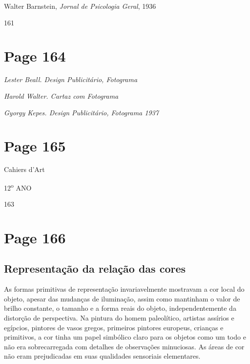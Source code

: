 \documentclass[a4paper]{article}
\begin{document}
\textbullet Walter Barnstein, \textit{Jornal de Psicologia Geral}, 1936

\vspace*{\fill}
\hfill 161

\newpage
\section*{Page 164}

\hspace*{0.3\textwidth}\textit{Lester Beall. Design Publicitário, Fotograma}

\vspace{8em} 

\noindent\textit{Harold Walter. Cartaz com Fotograma}

\vspace{8em} 

\raggedleft\textit{Gyorgy Kepes. Design Publicitário, Fotograma 1937}\par

\vspace{3em} 

\newpage
\section*{Page 165}

Cahiers d'Art

12\textsuperscript{o} ANO

163

\newpage
\section*{Page 166}

\subsection*{Representação da relação das cores}

As formas primitivas de representação invariavelmente mostravam a cor local do objeto, apesar das mudanças de iluminação, assim como mantinham o valor de brilho constante, o tamanho e a forma reais do objeto, independentemente da distorção de perspectiva. Na pintura do homem paleolítico, artistas assírios e egípcios, pintores de vasos gregos, primeiros pintores europeus, crianças e primitivos, a cor tinha um papel simbólico claro para os objetos como um todo e não era sobrecarregada com detalhes de observações minuciosas. As áreas de cor não eram prejudicadas em suas qualidades sensoriais elementares.
\end{document}

